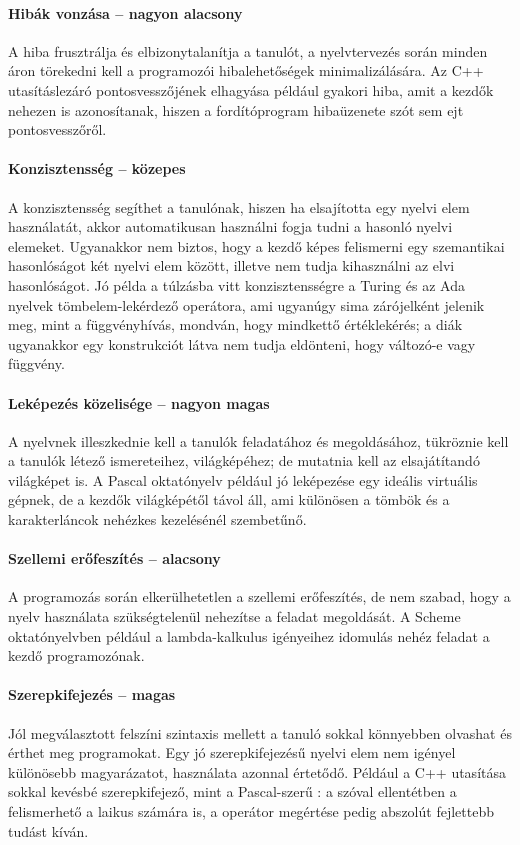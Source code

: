 \paragraph{Hibák vonzása -- nagyon alacsony} A hiba frusztrálja és elbizonytalanítja a tanulót, a nyelvtervezés során minden áron törekedni kell a programozói hibalehetőségek minimalizálására.
Az C++ utasításlezáró pontosvesszőjének elhagyása például gyakori hiba, amit a kezdők nehezen is azonosítanak, hiszen a  fordítóprogram hibaüzenete szót sem ejt pontosvesszőről.

\paragraph{Konzisztensség -- közepes} A konzisztensség segíthet a tanulónak, hiszen ha elsajította egy nyelvi elem használatát, akkor automatikusan használni fogja tudni a hasonló nyelvi elemeket.
Ugyanakkor nem biztos, hogy a kezdő képes felismerni egy szemantikai hasonlóságot két nyelvi elem között, illetve nem tudja kihasználni az elvi hasonlóságot.
Jó példa a túlzásba vitt konzisztensségre a Turing és az Ada nyelvek tömbelem-lekérdező operátora, ami ugyanúgy sima zárójelként jelenik meg, mint a függvényhívás, mondván, hogy mindkettő értéklekérés; a diák ugyanakkor egy  konstrukciót látva nem tudja eldönteni, hogy  változó-e vagy függvény.

\paragraph{Leképezés közelisége -- nagyon magas} A nyelvnek illeszkednie kell a tanulók feladatához és megoldásához, tükröznie kell a tanulók létező ismereteihez, világképéhez; de mutatnia kell az elsajátítandó világképet is.
A Pascal oktatónyelv például jó leképezése egy ideális virtuális gépnek, de a kezdők világképétől távol áll, ami különösen a tömbök és a karakterláncok nehézkes kezelésénél szembetűnő.

\paragraph{Szellemi erőfeszítés -- alacsony} A programozás során elkerülhetetlen a szellemi erőfeszítés, de nem szabad, hogy a nyelv használata szükségtelenül nehezítse a feladat megoldását. A Scheme oktatónyelvben például a lambda-kalkulus igényeihez idomulás nehéz feladat a kezdő programozónak.

\paragraph{Szerepkifejezés -- magas} Jól megválasztott felszíni szintaxis mellett a tanuló sokkal könnyebben olvashat és érthet meg programokat.
Egy jó szerepkifejezésű nyelvi elem nem igényel különösebb magyarázatot, használata azonnal értetődő.
Például a C++  utasítása sokkal kevésbé szerepkifejező, mint a Pascal-szerű : a  szóval ellentétben a  felismerhető a laikus számára is, a \cls{<<} operátor megértése pedig abszolút fejlettebb tudást kíván.

